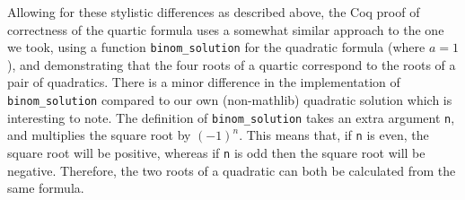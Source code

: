 \documentclass{article} %
\theoremstyle{plain}
\theoremstyle{definition}
\newcommand{\Lean}{\textsf{Lean}\xspace}
\newcommand{\mathlib}{\textsf{mathlib}\xspace}
\begin{document}
Allowing for these stylistic differences as described above, the Coq proof of correctness of the quartic formula uses a somewhat similar approach to the one we took,
using a function \lstinline{binom_solution} for the quadratic formula (where $a = 1$),
and demonstrating that the four roots of a quartic correspond to the roots of a pair of quadratics.
There is a minor difference in the implementation of \lstinline{binom_solution} compared to our own (non-\mathlib) quadratic solution which is interesting to note.
The definition of \lstinline{binom_solution} takes an extra argument \lstinline{n}, and multiplies the square root by $(-1)^n$.
This means that, if \lstinline{n} is even, the square root will be positive, whereas if \lstinline{n} is odd then the square root will be negative.
Therefore, the two roots of a quadratic can both be calculated from the same formula.
\end{document}
